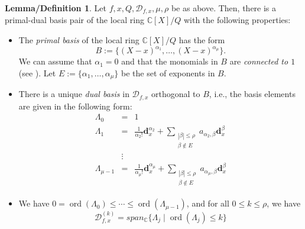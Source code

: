 \documentclass[12pt,oneside,reqno]{amsart}
\theoremstyle{definition}
\newtheorem{lemdef}[thm]{Lemma/Definition}
\newcommand{\CC}{\mathbb{C}}
\DeclareMathOperator{\ord}{ord}
\begin{document}
\begin{lemdef}\cite[Lemma 4.1]{hauenstein2015certifying}
	Let $f,x,Q,\mathcal{D}_{f,x},\mu, \rho$ be as above. Then, there is a primal-dual basis pair of the local ring $\mathbb{C}[X]/Q$ with the following properties:
	\begin{itemize}
		\item The {\it primal basis} of the local ring $\mathbb{C}[X]/Q$ has the form
		\[B:=\{(X-x)^{\alpha_1},\dots, (X-x)^{\alpha_\mu}\}.\]
		We can assume that $\alpha_1=0$ and that the monomials in $B$ are {\it connected to $1$} (see \cite{mourrain1999new}). Let $E:=\{\alpha_1,\dots, \alpha_\mu\}$ be the set of exponents in $B$.
		\item There is a unique {\it dual basis} in $\mathcal{D}_{f,x}$ orthogonal to $B$, i.e., the basis elements are given in the following form:
		\begin{eqnarray*}
		\Lambda_0 & = & 1\\
		\Lambda_1 & = & \frac{1}{\alpha_2!}\mathbf{d}_x^{\alpha_2}+\sum\limits_{\substack{|\beta|\leq \rho\\ \beta \notin E}}a_{\alpha_2,\beta}\mathbf{d}^\beta_x\\
		&\vdots &\\
		\Lambda_{\mu-1} & = & \frac{1}{\alpha_{\mu}!}\mathbf{d}_x^{\alpha_\mu}+\sum\limits_{\substack{|\beta|\leq \rho\\ \beta \notin E}}a_{\alpha_\mu,\beta}\mathbf{d}^\beta_x		
		\end{eqnarray*}
		\item We have $0=\ord(\Lambda_0)\leq \cdots \leq \ord(\Lambda_{\mu-1})$, and for all $0\leq k \leq \rho$, we have
		\[\mathcal{D}_{f,x}^{(k)}=span_\CC\{\Lambda_j\mid \ord(\Lambda_j)\leq k\}\]
	\end{itemize}
\end{lemdef}

\end{document}

